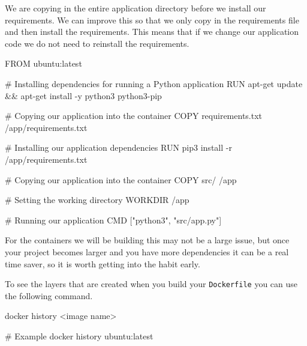 \documentclass{csse4400}
\begin{document}
We are copying in the entire application directory before we install our requirements.
We can improve this so that we only copy in the requirements file and then install the requirements.
This means that if we change our application code we do not need to reinstall the requirements.

\begin{code}[language=docker,numbers=none]{}
FROM ubuntu:latest

# Installing dependencies for running a Python application
RUN apt-get update && apt-get install -y python3 python3-pip

# Copying our application into the container
COPY requirements.txt /app/requirements.txt

# Installing our application dependencies
RUN pip3 install -r /app/requirements.txt

# Copying our application into the container
COPY src/ /app

# Setting the working directory
WORKDIR /app

# Running our application
CMD ["python3", "src/app.py"]
\end{code}

For the containers we will be building this may not be a large issue,
but once your project becomes larger and you have more dependencies it can be a real time saver,
so it is worth getting into the habit early.

To see the layers that are created when you build your \texttt{Dockerfile} you can use the following command.

\begin{code}[language=bash,numbers=none]{}
docker history <image name>

# Example
docker history ubuntu:latest
\end{code}

\end{document}
